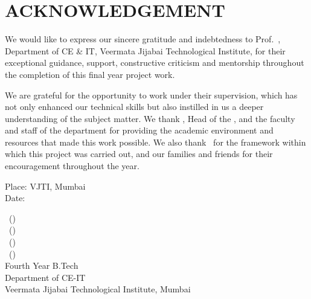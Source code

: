 \chapter*{ACKNOWLEDGEMENT}

\noindent\hspace*{1.25cm}We would like to express our sincere gratitude and indebtedness to Prof.\ \GuideName,
Department of CE \& IT, Veermata Jijabai Technological Institute, for their exceptional guidance, support,
constructive criticism and mentorship throughout the completion of this final year project work.

We are grateful for the opportunity to work under their supervision, which has not only enhanced our technical
skills but also instilled in us a deeper understanding of the subject matter. We thank \HODName, Head of the
\Department, and the faculty and staff of the department for providing the academic environment and resources
that made this work possible. We also thank \University\ for the framework within which this project was
carried out, and our families and friends for their encouragement throughout the year.

\vspace{2cm}
\noindent Place: VJTI, Mumbai\\[2pt]
\noindent Date: \makebox[5cm][l]{\hrulefill}

\vspace{1cm}
\begin{flushright}
\StudentAName\ (\StudentARoll)\\
\StudentBName\ (\StudentBRoll)\\
\StudentCName\ (\StudentCRoll)\\
\StudentDName\ (\StudentDRoll)\\[8pt]
Fourth Year B.Tech\\
Department of CE-IT\\
Veermata Jijabai Technological Institute, Mumbai
\end{flushright}
